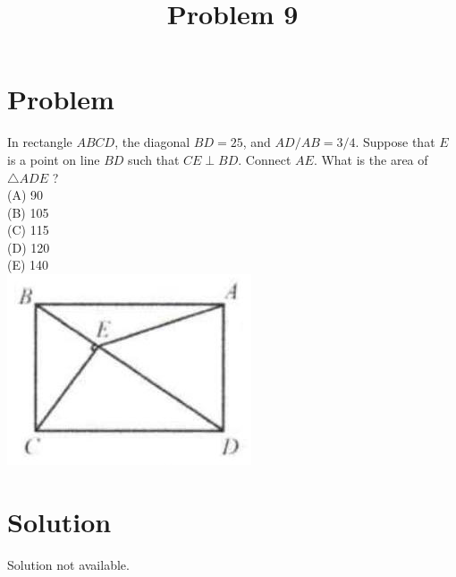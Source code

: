 \documentclass{article}
\title{Problem 9}
\date{}
\begin{document}
\maketitle

\section*{Problem}
In rectangle \(A B C D\), the diagonal \(B D=25\), and \(A D / A B=3 / 4\). Suppose that \(E\) is a point on line \(B D\) such that \(C E \perp B D\). Connect \(A E\). What is the area of \(\triangle A D E\) ?\\
(A) 90\\
(B) 105\\
(C) 115\\
(D) 120\\
(E) 140\\
\centering
\includegraphics[width=\textwidth]{images/089(1).jpg}

\section*{Solution}
Solution not available.
\end{document}
